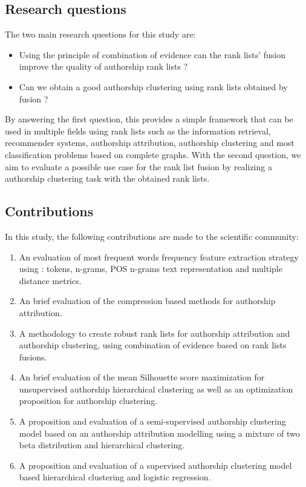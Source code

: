 \subsection{Research questions}

The two main research questions for this study are:

\begin{itemize}
  \item Using the principle of combination of evidence can the rank lists' fusion improve the quality of authorship rank lists ?
  \item Can we obtain a good authorship clustering using rank lists obtained by fusion ?
\end{itemize}

By answering the first question, this provides a simple framework that can be used in multiple fields using rank lists such as the information retrieval, recommender systems, authorship attribution, authorship clustering and most classification problems based on complete graphs.
With the second question, we aim to evaluate a possible use case for the rank list fusion by realizing a authorship clustering task with the obtained rank lists.

\subsection{Contributions}

In this study, the following contributions are made to the scientific community:

\begin{enumerate}
  \item An evaluation of most frequent words frequency feature extraction strategy using : tokens, n-grams, POS n-grams text representation and multiple distance metrics.
  \item An brief evaluation of the compression based methods for authorship attribution.
  \item A methodology to create robust rank lists for authorship attribution and authorship clustering, using combination of evidence based on rank lists fusions.
  \item An brief evaluation of the mean Silhouette score maximization for unsupervised authorship hierarchical clustering as well as an optimization proposition for authorship clustering.
  \item A proposition and evaluation of a semi-supervised authorship clustering model based on an authorship attribution modelling using a mixture of two beta distribution and hierarchical clustering.
  \item A proposition and evaluation of a supervised authorship clustering model based hierarchical clustering and logistic regression.
\end{enumerate}

